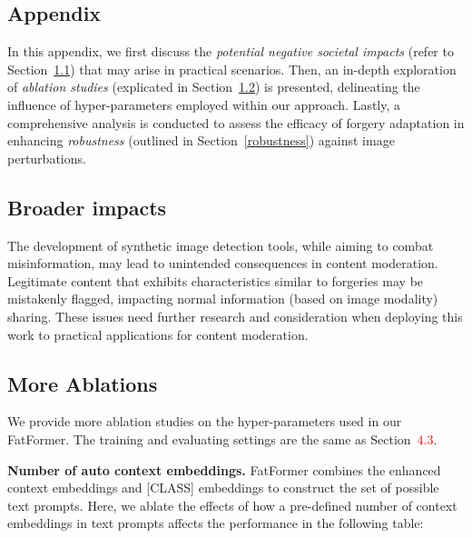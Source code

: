 \documentclass[10pt,twocolumn,letterpaper]{article}
\begin{document}
\clearpage
\begin{appendices}
\section{Appendix}
In this appendix, we first discuss the \textit{potential negative societal impacts} (refer to Section~\ref{impacts}) that may arise in practical scenarios. Then, an in-depth exploration of \textit{ablation studies} (explicated in Section~\ref{ablation}) is presented, delineating the influence of hyper-parameters employed within our approach. Lastly, a comprehensive analysis is conducted to assess the efficacy of forgery adaptation in enhancing \textit{robustness} (outlined in Section~\ref{robustness}) against image perturbations.

\subsection{Broader impacts}
\label{impacts}
The development of synthetic image detection tools, while aiming to combat misinformation, may lead to unintended consequences in content moderation. Legitimate content that exhibits characteristics similar to forgeries may be mistakenly flagged, impacting normal information (based on image modality) sharing. These issues need further research and consideration when deploying this work to practical applications for content moderation.

\subsection{More Ablations}
\label{ablation}
We provide more ablation studies on the hyper-parameters used in our FatFormer. The training and evaluating settings are the same as Section~\textcolor{red}{4.3}.

\noindent \textbf{Number of auto context embeddings.}
FatFormer combines the enhanced context embeddings and [CLASS] embeddings to construct the set of possible text prompts. Here, we ablate the effects of how a pre-defined number of context embeddings in text prompts affects the performance in the following table:
\begin{table}[h]
\centering
\vspace{-3mm}
\renewcommand\arraystretch{1.0}
\vspace{-3mm}
\end{table}


\end{appendices}
\end{document}
